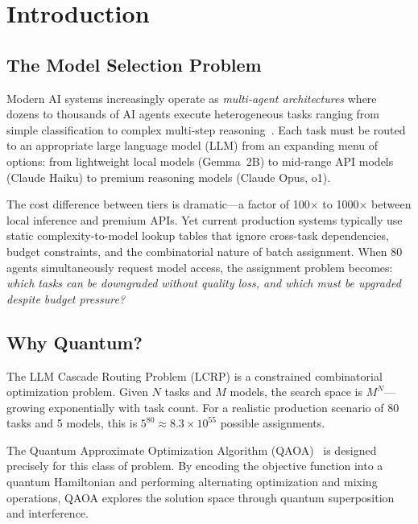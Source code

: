 \documentclass[conference]{IEEEtran}
\begin{document}
\section{Introduction}

\subsection{The Model Selection Problem}

Modern AI systems increasingly operate as \emph{multi-agent architectures} where dozens to thousands of AI agents execute heterogeneous tasks ranging from simple classification to complex multi-step reasoning~\cite{xi2023agents}. Each task must be routed to an appropriate large language model (LLM) from an expanding menu of options: from lightweight local models (Gemma~2B) to mid-range API models (Claude Haiku) to premium reasoning models (Claude Opus, o1).

The cost difference between tiers is dramatic---a factor of 100$\times$ to 1000$\times$ between local inference and premium APIs. Yet current production systems typically use static complexity-to-model lookup tables that ignore cross-task dependencies, budget constraints, and the combinatorial nature of batch assignment. When 80 agents simultaneously request model access, the assignment problem becomes: \emph{which tasks can be downgraded without quality loss, and which must be upgraded despite budget pressure?}

\subsection{Why Quantum?}

The LLM Cascade Routing Problem (LCRP) is a constrained combinatorial optimization problem. Given $N$ tasks and $M$ models, the search space is $M^N$---growing exponentially with task count. For a realistic production scenario of 80 tasks and 5 models, this is $5^{80} \approx 8.3 \times 10^{55}$ possible assignments.

The Quantum Approximate Optimization Algorithm (QAOA)~\cite{farhi2014qaoa} is designed precisely for this class of problem. By encoding the objective function into a quantum Hamiltonian and performing alternating optimization and mixing operations, QAOA explores the solution space through quantum superposition and interference.
\end{document}
